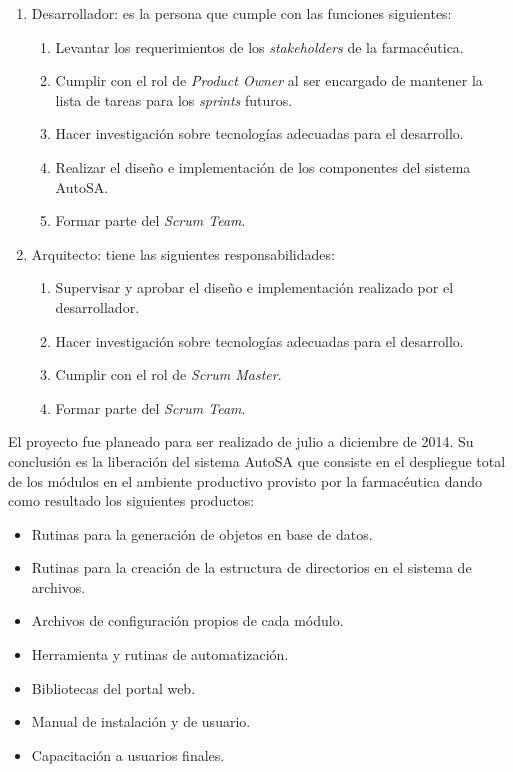 \begin{enumerate}
	\item Desarrollador: es la persona que cumple con las funciones siguientes:
	\begin{enumerate}
		\item Levantar los requerimientos de los \textit{stakeholders} de la farmacéutica.
		\item Cumplir con el rol de \textit{Product Owner} al ser encargado de mantener la lista de tareas para los \textit{sprints} futuros.
		\item Hacer investigación sobre tecnologías adecuadas para el desarrollo.
		\item Realizar el diseño e implementación de los componentes del sistema AutoSA.
		\item Formar parte del \textit{Scrum Team}.
	\end{enumerate}
	\item Arquitecto: tiene las siguientes responsabilidades:
	\begin{enumerate}
		\item Supervisar y aprobar el diseño e implementación realizado por el desarrollador.
		\item Hacer investigación sobre tecnologías adecuadas para el desarrollo.
		\item Cumplir con el rol de \textit{Scrum Master}.
		\item Formar parte del \textit{Scrum Team}.
	\end{enumerate}
\end{enumerate}
El proyecto fue planeado para ser realizado de julio a diciembre de 2014. Su conclusión es la liberación del sistema AutoSA que consiste en el despliegue total de los módulos en el ambiente productivo provisto por la farmacéutica dando como resultado los siguientes productos:
\begin{itemize}
\item Rutinas para la generación de objetos en base de datos.
\item Rutinas para la creación de la estructura de directorios en el sistema de archivos.
\item Archivos de configuración propios de cada módulo.
\item Herramienta y rutinas de automatización.
\item Bibliotecas del portal web.
\item Manual de instalación y de usuario.
\item Capacitación a usuarios finales.
\end{itemize}
